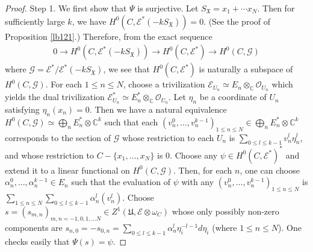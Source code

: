 \documentclass[12pt,b5paper,notitlepage]{report}
\theoremstyle{definition}
\theoremstyle{plain}
\newcommand{\fk}{\mathfrak}
\newcommand{\wtd}{\widetilde}
\newcommand{\scr}{\mathscr}
\newcommand{\SX}{S_{\fk X}}
\newcommand{\Cbb}{\mathbb C}
\numberwithin{equation}{section}
\begin{document}
\begin{proof}
Step 1. We first show that $\Psi$ is surjective. Let $\SX=x_1+\cdots x_N$. Then for sufficiently large $k$, we have $H^0(C,\scr E^*(-k\SX))=0$. (See the proof of Proposition \ref{lb121}.) Therefore, from the exact sequence
\begin{align*}
0\rightarrow H^0(C,\scr E^*(-k\SX))\rightarrow H^0(C,\scr E^*)\rightarrow H^0(C,\scr G)
\end{align*} 
where $\scr G=\scr E^*/\scr E^*(-k\SX)$, we see that $H^0(C,\scr E^*)$ is naturally a subspace of $H^0(C,\scr G)$. For each $1\leq n\leq N$, choose a trivilization $\scr E_{U_n}\simeq E_n\otimes_\Cbb\scr O_{U_n}$ which yields the dual trivilization $\scr E_{U_n}^*\simeq E_n^*\otimes_\Cbb\scr O_{U_n}$. Let $\eta_n$ be a coordinate of $U_n$ satisfying $\eta_n(x_n)=0$. Then we have a natural equivalence $H^0(C,\scr G)\simeq\bigoplus_n E_n^*\otimes \Cbb^k$ such that each  $(v_n^0,\dots,v_n^{k-1})_{1\leq n\leq N}\in \bigoplus_n E_n^*\otimes \Cbb^k$   corresponds to the section of $\scr G$ whose restriction to each $U_n$ is $\sum_{0\leq l\leq k-1}v_n^l\eta_n^l$, and whose restriction to $C-\{x_1,\dots,x_N\}$ is $0$. Choose any $\psi\in H^0(C,\scr E^*)^*$ and extend it to a linear functional on $H^0(C,\scr G)$. Then, for each $n$, one can choose $\alpha_n^0,\dots,\alpha_n^{k-1}\in E_n$ such that the evaluation of $\psi$ with any $(v_n^0,\dots,v_n^{k-1})_{1\leq n\leq N}$ is $\sum_{1\leq n\leq N}\sum_{0\leq l\leq k-1}\alpha_n^l(v_n^l)$. Choose $s=(s_{m,n})_{m,n=-1,0,1,\dots N}\in Z^1(\fk U,\scr E\otimes\omega_C)$ whose only possibly non-zero components are $s_{n,0}=-s_{0,n}=\sum_{0\leq l\leq k-1}\alpha_n^l\eta_i^{-l-1}d\eta_i$ (where $1\leq n\leq N$). One checks easily that $\Psi(s)=\psi$.








\end{proof}
\end{document}
